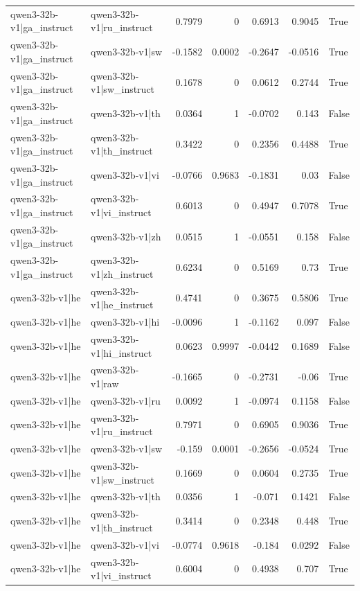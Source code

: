 \begin{table}
\begin{tabular}{l l r r r r l}
qwen3-32b-v1|ga_instruct & qwen3-32b-v1|ru_instruct & 0.7979 & 0 & 0.6913 & 0.9045 & True \\
qwen3-32b-v1|ga_instruct & qwen3-32b-v1|sw & -0.1582 & 0.0002 & -0.2647 & -0.0516 & True \\
qwen3-32b-v1|ga_instruct & qwen3-32b-v1|sw_instruct & 0.1678 & 0 & 0.0612 & 0.2744 & True \\
qwen3-32b-v1|ga_instruct & qwen3-32b-v1|th & 0.0364 & 1 & -0.0702 & 0.143 & False \\
qwen3-32b-v1|ga_instruct & qwen3-32b-v1|th_instruct & 0.3422 & 0 & 0.2356 & 0.4488 & True \\
qwen3-32b-v1|ga_instruct & qwen3-32b-v1|vi & -0.0766 & 0.9683 & -0.1831 & 0.03 & False \\
qwen3-32b-v1|ga_instruct & qwen3-32b-v1|vi_instruct & 0.6013 & 0 & 0.4947 & 0.7078 & True \\
qwen3-32b-v1|ga_instruct & qwen3-32b-v1|zh & 0.0515 & 1 & -0.0551 & 0.158 & False \\
qwen3-32b-v1|ga_instruct & qwen3-32b-v1|zh_instruct & 0.6234 & 0 & 0.5169 & 0.73 & True \\
qwen3-32b-v1|he & qwen3-32b-v1|he_instruct & 0.4741 & 0 & 0.3675 & 0.5806 & True \\
qwen3-32b-v1|he & qwen3-32b-v1|hi & -0.0096 & 1 & -0.1162 & 0.097 & False \\
qwen3-32b-v1|he & qwen3-32b-v1|hi_instruct & 0.0623 & 0.9997 & -0.0442 & 0.1689 & False \\
qwen3-32b-v1|he & qwen3-32b-v1|raw & -0.1665 & 0 & -0.2731 & -0.06 & True \\
qwen3-32b-v1|he & qwen3-32b-v1|ru & 0.0092 & 1 & -0.0974 & 0.1158 & False \\
qwen3-32b-v1|he & qwen3-32b-v1|ru_instruct & 0.7971 & 0 & 0.6905 & 0.9036 & True \\
qwen3-32b-v1|he & qwen3-32b-v1|sw & -0.159 & 0.0001 & -0.2656 & -0.0524 & True \\
qwen3-32b-v1|he & qwen3-32b-v1|sw_instruct & 0.1669 & 0 & 0.0604 & 0.2735 & True \\
qwen3-32b-v1|he & qwen3-32b-v1|th & 0.0356 & 1 & -0.071 & 0.1421 & False \\
qwen3-32b-v1|he & qwen3-32b-v1|th_instruct & 0.3414 & 0 & 0.2348 & 0.448 & True \\
qwen3-32b-v1|he & qwen3-32b-v1|vi & -0.0774 & 0.9618 & -0.184 & 0.0292 & False \\
qwen3-32b-v1|he & qwen3-32b-v1|vi_instruct & 0.6004 & 0 & 0.4938 & 0.707 & True \\

\end{tabular}
\end{table}
